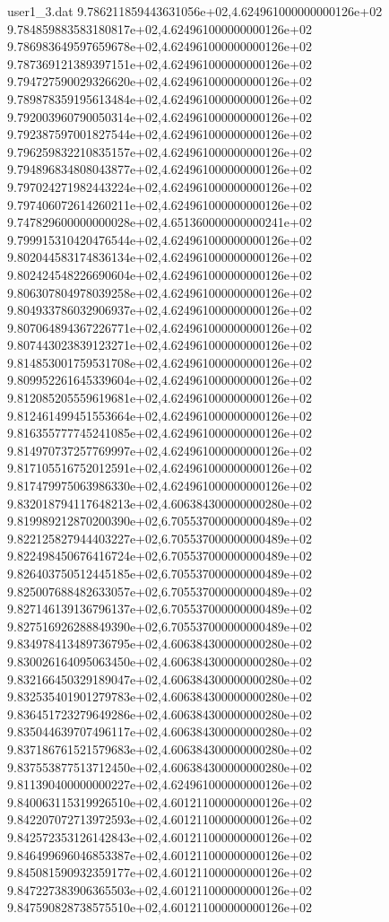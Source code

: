 \begin{filecontents}{user1_3.dat}
9.786211859443631056e+02,4.624961000000000126e+02
9.784859883583180817e+02,4.624961000000000126e+02
9.786983649597659678e+02,4.624961000000000126e+02
9.787369121389397151e+02,4.624961000000000126e+02
9.794727590029326620e+02,4.624961000000000126e+02
9.789878359195613484e+02,4.624961000000000126e+02
9.792003960790050314e+02,4.624961000000000126e+02
9.792387597001827544e+02,4.624961000000000126e+02
9.796259832210835157e+02,4.624961000000000126e+02
9.794896834808043877e+02,4.624961000000000126e+02
9.797024271982443224e+02,4.624961000000000126e+02
9.797406072614260211e+02,4.624961000000000126e+02
9.747829600000000028e+02,4.651360000000000241e+02
9.799915310420476544e+02,4.624961000000000126e+02
9.802044583174836134e+02,4.624961000000000126e+02
9.802424548226690604e+02,4.624961000000000126e+02
9.806307804978039258e+02,4.624961000000000126e+02
9.804933786032906937e+02,4.624961000000000126e+02
9.807064894367226771e+02,4.624961000000000126e+02
9.807443023839123271e+02,4.624961000000000126e+02
9.814853001759531708e+02,4.624961000000000126e+02
9.809952261645339604e+02,4.624961000000000126e+02
9.812085205559619681e+02,4.624961000000000126e+02
9.812461499451553664e+02,4.624961000000000126e+02
9.816355777745241085e+02,4.624961000000000126e+02
9.814970737257769997e+02,4.624961000000000126e+02
9.817105516752012591e+02,4.624961000000000126e+02
9.817479975063986330e+02,4.624961000000000126e+02
9.832018794117648213e+02,4.606384300000000280e+02
9.819989212870200390e+02,6.705537000000000489e+02
9.822125827944403227e+02,6.705537000000000489e+02
9.822498450676416724e+02,6.705537000000000489e+02
9.826403750512445185e+02,6.705537000000000489e+02
9.825007688482633057e+02,6.705537000000000489e+02
9.827146139136796137e+02,6.705537000000000489e+02
9.827516926288849390e+02,6.705537000000000489e+02
9.834978413489736795e+02,4.606384300000000280e+02
9.830026164095063450e+02,4.606384300000000280e+02
9.832166450329189047e+02,4.606384300000000280e+02
9.832535401901279783e+02,4.606384300000000280e+02
9.836451723279649286e+02,4.606384300000000280e+02
9.835044639707496117e+02,4.606384300000000280e+02
9.837186761521579683e+02,4.606384300000000280e+02
9.837553877513712450e+02,4.606384300000000280e+02
9.811390400000000227e+02,4.624961000000000126e+02
9.840063115319926510e+02,4.601211000000000126e+02
9.842207072713972593e+02,4.601211000000000126e+02
9.842572353126142843e+02,4.601211000000000126e+02
9.846499696046853387e+02,4.601211000000000126e+02
9.845081590932359177e+02,4.601211000000000126e+02
9.847227383906365503e+02,4.601211000000000126e+02
9.847590828738575510e+02,4.601211000000000126e+02

\end{filecontents}

